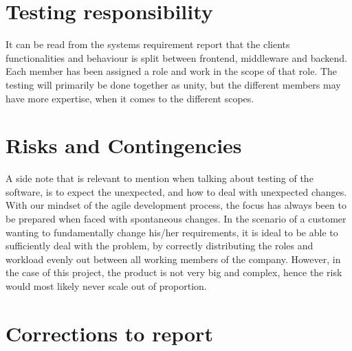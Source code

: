 \documentclass{article}
\begin{document}
\section*{Testing responsibility}
It can be read from the systems requirement report that the clients functionalities and behaviour is split between frontend, middleware and backend. Each member has been assigned a role and work in the scope of that role. The testing will primarily be done together as unity, but the different members may have more expertise, when it comes to the different scopes.

\section*{Risks and Contingencies}

A side note that is relevant to mention when talking about testing of the software, is to expect the unexpected, and how to deal with unexpected changes. With our mindset of the agile development process, the focus has always been to be prepared when faced with spontaneous changes. In the scenario of a customer wanting to fundamentally change his/her requirements, it is ideal to be able to sufficiently deal with the problem, by correctly distributing the roles and workload evenly out between all working members of the company. However, in the case of this project, the product is not very big and complex, hence the risk would most likely never scale out of proportion.
\newpage

\section*{Corrections to report}
\end{document}
